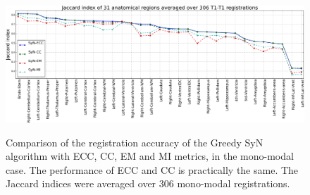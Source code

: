 \begin{figure}[t!]
\centering
\includegraphics[width=0.95\linewidth]{./images/mono_lines_seg.png}\\
\caption{{\small Comparison of the registration accuracy of the Greedy SyN algorithm with ECC, CC, EM and MI metrics, in the mono-modal case. The performance of ECC and CC is practically the same. The Jaccard indices were averaged over 306 mono-modal registrations.}}
\label{fig:mono_graph_seg}\figcloser
\end{figure}

